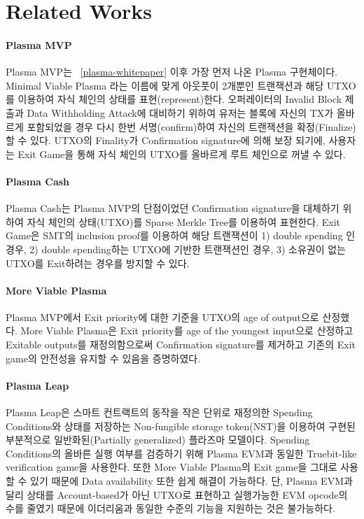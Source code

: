 \documentclass[letterpaper, 11pt]{article}
\begin{document}
\section{Related Works}
\begin{CJK}{UTF8}{mj}
\paragraph{Plasma MVP}
Plasma MVP는 ~\ref{plasma-whitepaper} 이후 가장 먼저 나온 Plasma 구현체이다. Minimal Viable Plasma 라는 이름에 맞게 아웃풋이 2개뿐인 트랜잭션과 해당 UTXO를 이용하여 자식 체인의 상태를 표현(represent)한다. 오퍼레이터의 Invalid Block 제출과 Data Withholding Attack에 대비하기 위하여 유저는 블록에 자신의 TX가 올바르게 포함되었을 경우 다시 한번 서명(confirm)하여 자신의 트랜잭션을 확정(Finalize)할 수 있다. UTXO의 Finality가 Confirmation signature에 의해 보장 되기에, 사용자는 Exit Game을 통해 자식 체인의 UTXO를 올바르게 루트 체인으로 꺼낼 수 있다.

\paragraph{Plasma Cash} Plasma Cash는 Plasma MVP의 단점이었던 Confirmation signature을 대체하기 위하여 자식 체인의 상태(UTXO)를 Sparse Merkle Tree를 이용하여 표현한다. Exit Game은 SMT의 inclusion proof를 이용하여 해당 트랜잭션이 1) double spending 인 경우, 2) double spending하는 UTXO에 기반한 트랜잭션인 경우, 3) 소유권이 없는 UTXO를 Exit하려는 경우를 방지할 수 있다.

\paragraph{More Viable Plasma}
Plasma MVP에서 Exit priority에 대한 기준을 UTXO의 age of output으로 산정했다. More Viable Plasma은 Exit priority를 age of the youngest input으로 산정하고 Exitable outputs를 재정의함으로써 Confirmation signature를 제거하고 기존의 Exit game의 안전성을 유지할 수 있음을 증명하였다.

\paragraph{Plasma Leap}
Plasma Leap은 스마트 컨트랙트의 동작을 작은 단위로 재정의한 Spending Conditions와 상태를 저장하는 Non-fungible storage token(NST)을 이용하여 구현된 부분적으로 일반화된(Partially generalized) 플라즈마 모델이다. Spending Conditions의 올바른 실행 여부를 검증하기 위해 Plasma EVM과 동일한 Truebit-like verification game을 사용한다. 또한 More Viable Plasma의 Exit game을 그대로 사용할 수 있기 때문에 Data availability 또한 쉽게 해결이 가능하다. 단, Plasma EVM과 달리 상태를 Account-based가 아닌 UTXO로 표현하고 실행가능한 EVM opcode의 수를 줄였기 때문에 이더리움과 동일한 수준의 기능을 지원하는 것은 불가능하다.

\end{CJK}
\end{document}
